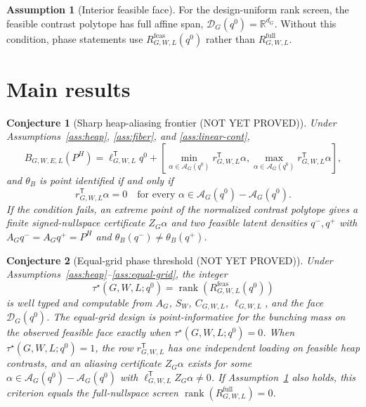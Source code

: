 \documentclass[11pt]{article}
\newcommand{\transpose}{\mathsf{T}}
\theoremstyle{definition}
\newtheorem{assumption}{Assumption}
\theoremstyle{plain}
\newtheorem{conjecture}{Conjecture}
\theoremstyle{remark}
\begin{document}
\begin{assumption}[Interior feasible face]\label{ass:face}
For the design-uniform rank screen, the feasible contrast polytope has full affine span, \(\mathcal{D}_G(q^0)=\mathbb{R}^{d_G}\).  Without this condition, phase statements use \(R^{\mathrm{feas}}_{G,W,L}(q^0)\) rather than \(R^{\mathrm{full}}_{G,W,L}\).
\end{assumption}

\section{Main results}
\begin{conjecture}[Sharp heap-aliasing frontier (NOT YET PROVED)]\label{conj:frontier}
Under Assumptions~\ref{ass:heap}, \ref{ass:fiber}, and \ref{ass:linear-cont},
\[
B_{G,W,E,L}(P^H)=
\ell_{G,W,L}^{\transpose}q^0+
\left[
\min_{\alpha\in\mathcal{A}_G(q^0)} r_{G,W,L}^{\transpose}\alpha,
\max_{\alpha\in\mathcal{A}_G(q^0)} r_{G,W,L}^{\transpose}\alpha
\right],
\]
and \(\theta_B\) is point identified if and only if
\[
r_{G,W,L}^{\transpose}\alpha=0
\quad\text{for every }\alpha\in\mathcal{A}_G(q^0)-\mathcal{A}_G(q^0).
\]
If the condition fails, an extreme point of the normalized contrast polytope gives a finite signed-nullspace certificate \(Z_G\alpha\) and two feasible latent densities \(q^-,q^+\) with \(A_Gq^-=A_Gq^+=P^H\) and \(\theta_B(q^-)\neq\theta_B(q^+)\).
\end{conjecture}

\begin{conjecture}[Equal-grid phase threshold (NOT YET PROVED)]\label{conj:phase}
Under Assumptions~\ref{ass:heap}--\ref{ass:equal-grid}, the integer
\[
\tau^\star(G,W,L;q^0)=\operatorname{rank}(R^{\mathrm{feas}}_{G,W,L}(q^0))
\]
is well typed and computable from \(A_G\), \(S_W\), \(C_{G,W,L}\), \(\ell_{G,W,L}\), and the face \(\mathcal{D}_G(q^0)\).  The equal-grid design is point-informative for the bunching mass on the observed feasible face exactly when \(\tau^\star(G,W,L;q^0)=0\).  When \(\tau^\star(G,W,L;q^0)=1\), the row \(r_{G,W,L}^{\transpose}\) has one independent loading on feasible heap contrasts, and an aliasing certificate \(Z_G\alpha\) exists for some \(\alpha\in\mathcal{A}_G(q^0)-\mathcal{A}_G(q^0)\) with \(\ell_{G,W,L}^{\transpose}Z_G\alpha\neq0\).  If Assumption~\ref{ass:face} also holds, this criterion equals the full-nullspace screen \(\operatorname{rank}(R^{\mathrm{full}}_{G,W,L})=0\).
\end{conjecture}
\end{document}
